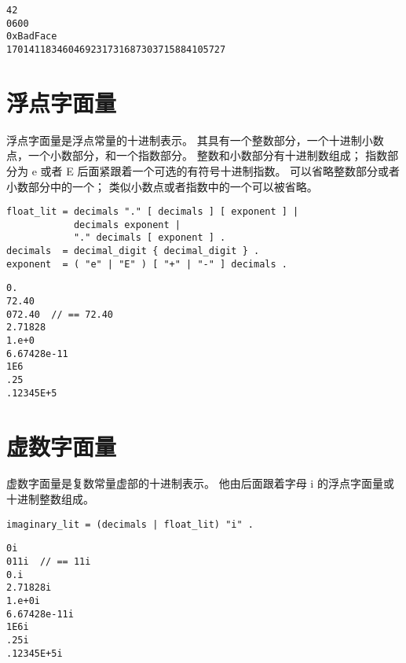 \begin{lstlisting}[style=golang]
42
0600
0xBadFace
170141183460469231731687303715884105727
\end{lstlisting}


\section{浮点字面量}
浮点字面量是浮点常量的十进制表示。
其具有一个整数部分，一个十进制小数点，一个小数部分，和一个指数部分。
整数和小数部分有十进制数组成；
指数部分为 e 或者 E 后面紧跟着一个可选的有符号十进制指数。
可以省略整数部分或者小数部分中的一个；
类似小数点或者指数中的一个可以被省略。
\begin{lstlisting}[style=golang]
float_lit = decimals "." [ decimals ] [ exponent ] |
            decimals exponent |
            "." decimals [ exponent ] .
decimals  = decimal_digit { decimal_digit } .
exponent  = ( "e" | "E" ) [ "+" | "-" ] decimals .
\end{lstlisting}

\begin{lstlisting}[style=EBNF]
0.
72.40
072.40  // == 72.40
2.71828
1.e+0
6.67428e-11
1E6
.25
.12345E+5
\end{lstlisting}

\section{虚数字面量}
虚数字面量是复数常量虚部的十进制表示。
他由后面跟着字母 i 的浮点字面量或十进制整数组成。
\begin{lstlisting}[style=EBNF]
imaginary_lit = (decimals | float_lit) "i" .
\end{lstlisting}

\begin{lstlisting}[style=golang]
0i
011i  // == 11i
0.i
2.71828i
1.e+0i
6.67428e-11i
1E6i
.25i
.12345E+5i
\end{lstlisting}


